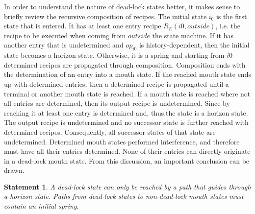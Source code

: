 \documentclass[12pt,a4paper]{scrartcl}
\newtheorem{statement}{Statement}
\begin{document}
In order to understand the nature of dead-lock states better, it makes sense to
briefly review the recursive composition of recipes. The initial state $i_0$
is the first state that is entered. It has at least one entry recipe
$R_E(i0,outside)$, i.e. the recipe to be executed when coming from $outside$
the state machine. If it has another entry that is undetermined and $op_{i0}$
is history-dependent, then the initial state becomes a horizon state.  Otherwise, it
is a spring and starting from $i0$ determined recipes are propagated through
composition.  Composition ends with the determination of an entry into a
mouth state. If the reached mouth state ends up with determined entries, then a
determined recipe is propagated until a terminal or another mouth state is
reached. If a mouth state is reached where not all entries are determined, then
its output recipe is undetermined. Since by reaching it at least one entry is
determined and, thus,the state is a horizon state. The output recipe is
undetermined and no successor state is further reached with determined recipes.
Consequently, all successor states of that state are undetermined.  Determined
mouth states performed interference, and therefore must have all their entries
determined.  None of their entries can directly originate in a dead-lock mouth
state. From this discussion, an important conclusion can be drawn.  

\begin{statement} \label{stm:dead-lock-horizon}
A dead-lock state can only be reached by a path that guides through a horizon
state.  Paths from dead-lock states to non-dead-lock mouth states must contain
an initial spring.  
\end{statement}
\end{document}
